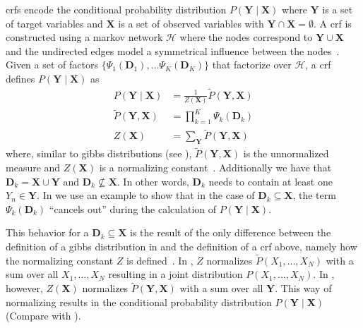 \bigskip

\Glspl{crf} encode the \gls{conditional probability distribution} $P(\mathbf{Y}\mid\mathbf{X})$ where $\mathbf{Y}$ is a set of \glspl{target variable} and $\mathbf{X}$ is a set of \glspl{observed variable} with $\mathbf{Y}\cap\mathbf{X}=\emptyset$.
A \gls{crf} is constructed using a \gls{markov network} $\mathcal{H}$ where the nodes correspond to $\mathbf{Y}\cup\mathbf{X}$ and the undirected edges model a symmetrical influence between the nodes~\citep{koller2009probabilistic}.
Given a set of \glspl{factor} $\{\Psi_1(\mathbf{D}_1),\dots\Psi_K(\mathbf{D}_K)\}$ that factorize over $\mathcal{H}$, a \gls{crf} defines $P(\mathbf{Y}\mid\mathbf{X})$ as~\citep{koller2009probabilistic}
\begin{equation}
  \label{equ:crf-factor}
  \begin{split}
    P(\mathbf{Y}\mid\mathbf{X}) & = \frac{1}{Z(\mathbf{X})}\tilde{P}(\mathbf{Y},\mathbf{X}) \\
    \tilde{P}(\mathbf{Y},\mathbf{X}) &= \prod_{k=1}^{K}\Psi_k\left(\mathbf{D}_k\right) \\
    Z(\mathbf{X}) & = \sum_{\mathbf{Y}}\tilde{P}(\mathbf{Y},\mathbf{X})
  \end{split}
\end{equation}
where, similar to \glspl{gibbs distribution} (see ), $\tilde{P}(\mathbf{Y},\mathbf{X})$ is the unnormalized measure and $Z(\mathbf{X})$ is a normalizing constant~\citep{koller2009probabilistic}.
Additionally we have that $\mathbf{D}_k=\mathbf{X}\cup\mathbf{Y}$ and $\mathbf{D}_k\not\subseteq\mathbf{X}$.
In other words, $\mathbf{D}_k$ needs to contain at least one $Y_n\in \mathbf{Y}$.
In  we use an example to show that in the case of $\mathbf{D}_k\subseteq \mathbf{X}$, the term $\Psi_k(\mathbf{D}_k)$ ``cancels out'' during the calculation of $P(\mathbf{Y}\mid\mathbf{X})$.

This behavior for a $\mathbf{D}_k\subseteq\mathbf{X}$ is the result of the only difference between the definition of a \gls{gibbs distribution} in  and the definition of a \gls{crf} above, namely how the normalizing constant $Z$ is defined~\citep{koller2009probabilistic}.
In , $Z$ normalizes $\tilde{P}(X_1,\dots,X_N)$ with a sum over all $X_1,\dots,X_N$ resulting in a \gls{joint distribution} $P(X_1,\dots,X_N)$.
In , however, $Z(\mathbf{X})$ normalizes $\tilde{P}(\mathbf{Y},\mathbf{X})$ with a sum over all $\mathbf{Y}$.
This way of normalizing results in the \gls{conditional probability distribution} $P(\mathbf{Y}\mid\mathbf{X})$ (Compare with ).

